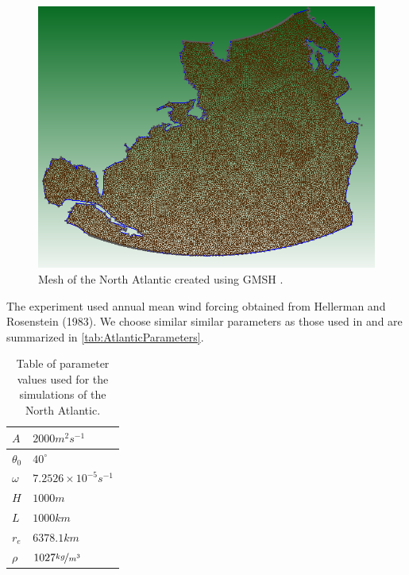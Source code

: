 \begin{figure}
  \begin{center}
    \includegraphics[scale=0.5]{NAMesh.png}
    \caption{Mesh of the North Atlantic created using GMSH \cite{GMSH}.}
    \label{fig:AtlanticMesh}
  \end{center}
\end{figure}

The experiment used annual mean wind forcing obtained from Hellerman and
Rosenstein (1983). We choose similar similar parameters as those used in
\cite{delSastre04} and are summarized in \autoref{tab:AtlanticParameters}.

\begin{table}
  \begin{center}
  \begin{tabular}{|l|l|}
    \hline
    $A$ & $2000m^2s^{-1}$\\
    \hline
    $\theta_0$ & $40^\circ$ \\
    \hline
    $\omega$ & $7.2526\times 10^{-5}s^{-1}$ \\
    \hline
    $H$ & $1000m$ \\
    \hline
    $L$ & $1000km$ \\
    \hline
    $r_e$ & $6378.1km$ \\
    \hline
    $\rho$ & $1027 \nicefrac{kg}{m^3}$ \\
    \hline
  \end{tabular}
  \end{center}
  \caption{Table of parameter values used for the simulations of the North
    Atlantic. \cite{delSastre04}}
  \label{tab:AtlanticParameters}
\end{table}

